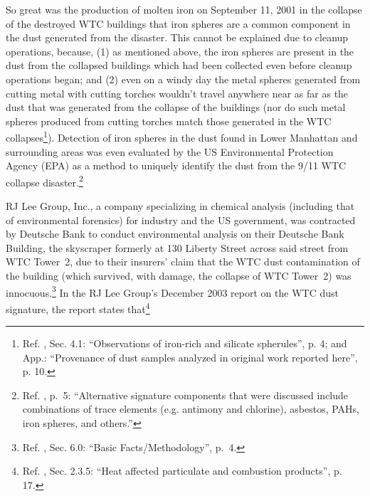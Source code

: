 \documentclass[letterpaper,12pt]{article}
\begin{document}
So great was the production of molten iron on September 11, 2001 in the collapse of the destroyed WTC buildings that iron spheres are a common component in the dust generated from the disaster. This cannot be explained due to cleanup operations, because, (1) as mentioned above, the iron spheres are present in the dust from the collapsed buildings which had been collected even before cleanup operations began; and (2) even on a windy day the metal spheres generated from cutting metal with cutting torches wouldn't travel anywhere near as far as the dust that was generated from the collapse of the buildings (nor do such metal spheres produced from cutting torches match those generated in the WTC collapses\footnote{Ref. , Sec. 4.1: ``Observations of iron-rich and silicate spherules'', p. 4; and App.: ``Provenance of dust samples analyzed in original work reported here'', p. 10.}). Detection of iron spheres in the dust found in Lower Manhattan and surrounding areas was even evaluated by the US Environmental Protection Agency (EPA) as a method to uniquely identify the dust from the 9/11 WTC collapse disaster.\footnote{Ref. , p.~5: ``Alternative signature components that were discussed include combinations of trace elements (e.g. antimony and chlorine), asbestos, PAHs, iron spheres, and others.''}

RJ Lee Group, Inc., a company specializing in chemical analysis (including that of environmental forensics) for industry and the US government, was contracted by Deutsche Bank to conduct environmental analysis on their Deutsche Bank Building, the skyscraper formerly at 130 Liberty Street across said street from WTC Tower~2, due to their insurers' claim that the WTC dust contamination of the building (which survived, with damage, the collapse of WTC Tower~2) was innocuous.\footnote{Ref. , Sec. 6.0: ``Basic Facts\slash Methodology'', p.~4.} In the RJ Lee Group's December 2003 report on the WTC dust signature, the report states that\footnote{Ref. , Sec. 2.3.5: ``Heat affected particulate and combustion products'', p. 17.}
\end{document}
